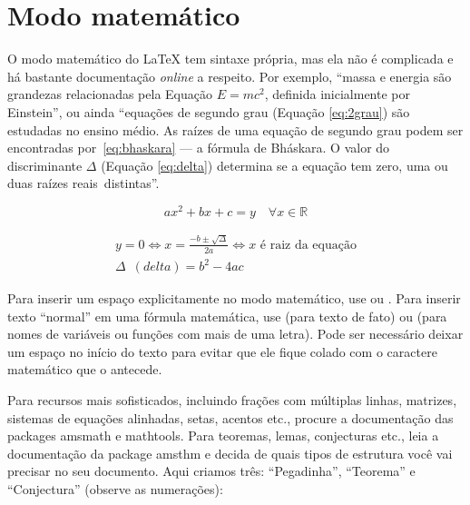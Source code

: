 \enlargethispage{.5\baselineskip}

\section{Modo matemático}

O modo matemático do \LaTeX{} tem sintaxe própria, mas ela não é complicada e
há bastante documentação \emph{online} a respeito. Por exemplo, ``massa e
energia são grandezas relacionadas pela Equação $E=mc^2$, definida inicialmente
por Einstein'', ou ainda ``equações de segundo grau (Equação \ref{eq:2grau})
são estudadas no ensino médio. As raízes de uma equação de segundo grau podem
ser encontradas por~\eqref{eq:bhaskara} --- a fórmula de Bháskara.
O valor do discriminante $\Delta$ (Equação \ref{eq:delta}) determina se a
equação tem zero, uma ou duas raízes reais~distintas''.

\begin{equation}
  \label{eq:2grau}
  ax^2+bx+c=y \quad \forall x \in \mathbb{R}
\end{equation}

\begin{gather}
  \label{eq:bhaskara}
    y=0 \Leftrightarrow x=\frac{-b \pm \sqrt{\Delta}}{2a}
    \Leftrightarrow x \text{ é raiz da equação}\\
  \label{eq:delta}
    \Delta\enspace(\mathit{delta}) = b^2-4ac
\end{gather}

\enlargethispage{.5\baselineskip}

Para inserir um espaço explicitamente no modo matemático, use
 ou . Para inserir texto ``normal'' em
uma fórmula matemática, use  (para texto de fato)
ou  (para nomes de variáveis ou funções com
mais de uma letra). Pode ser necessário deixar um espaço no início do
texto para evitar que ele fique colado com o caractere matemático que
o antecede.

Para recursos mais sofisticados, incluindo frações com múltiplas linhas,
matrizes, sistemas de equações alinhadas, setas, acentos etc., procure
a documentação das packages \textsf{amsmath} e \textsf{mathtools}. Para
teoremas, lemas, conjecturas etc., leia a documentação da package
\textsf{amsthm} e decida de quais tipos de estrutura você vai precisar
no seu documento. Aqui criamos três: ``Pegadinha'', ``Teorema'' e
``Conjectura'' (observe as numerações):

